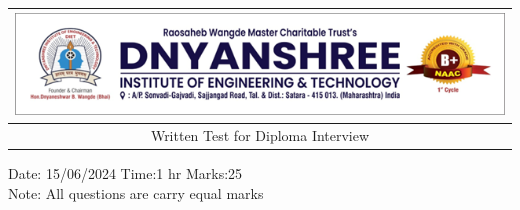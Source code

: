 \documentclass[a4, 12pt, addpoints]{exam}
\begin{document}
\def\arraystretch{2}
\begin{longtable}{lp{}p{}r}
\multicolumn{4}{c}{\includegraphics[width= \textwidth]{dietlogo}} \\ 
\hline 
\multicolumn{4}{c}{Written Test for Diploma Interview} \\
\end{longtable}
{
\hfill Date: 15/06/2024 \hfill Time:1 hr  \hfill Marks:25 \hfill } \\ 
Note: All questions are carry equal marks
\end{document}
